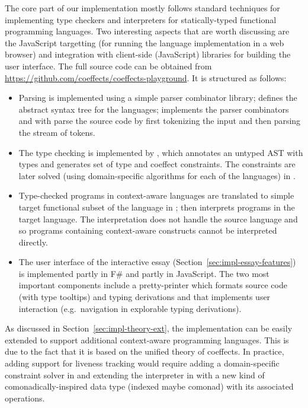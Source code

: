 The core part of our implementation mostly follows standard techniques for implementing type
checkers and interpreters for statically-typed functional programming languages. Two interesting
aspects that are worth discussing are the JavaScript targetting (for running the language
implementation in a web browser) and integration with client-side (JavaScript) libraries for
building the user interface. The full source code can be obtained from
\url{https://github.com/coeffects/coeffects-playground}. It is structured as follows:
%
\begin{itemize}
\item Parsing is implemented using a simple parser combinator library;  defines the
  abstract syntax tree for the languages;  implements the parser combinators
  and  with  parse the source code by first tokenizing
  the input and then parsing the stream of tokens.

\item The type checking is implemented by , which annotates an untyped AST
  with types and generates set of type and coeffect constraints. The constraints are later solved
  (using domain-specific algorithms for each of the languages) in .

\item Type-checked programs in context-aware languages are translated to simple target
  functional subset of the language in ;  then interprets
  programs in the target language. The interpretation does not handle the source
  language and so programs containing context-aware constructs cannot be interpreted directly.

\item The user interface of the interactive essay (Section~\ref{sec:impl-essay-features})
  is implemented partly in F\# and partly in JavaScript. The two most important components include
  a pretty-printer  which formats source code (with type tooltips) and typing
  derivations and  that implements user interaction (e.g.~navigation in explorable
  typing derivations).
\end{itemize}

\noindent
As discussed in Section~\ref{sec:impl-theory-ext}, the implementation can be easily extended to
support additional context-aware programming languages. This is due to the fact that it is based
on the unified theory of coeffects. In practice, adding support for liveness tracking would
require adding a domain-specific constraint solver in  and extending the
interpreter in  with a new kind of comonadically-inspired data type
(indexed maybe comonad) with its associated operations.

